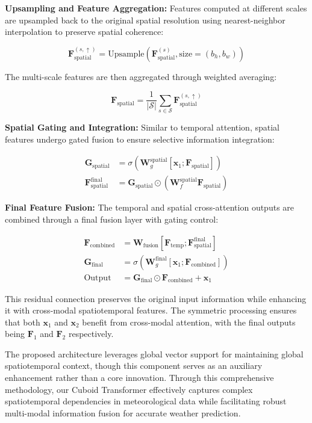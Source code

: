 \textbf{Upsampling and Feature Aggregation:} Features computed at different scales are upsampled back to the original spatial resolution using nearest-neighbor interpolation to preserve spatial coherence:

\begin{equation}
\mathbf{F}_{\text{spatial}}^{(s,\uparrow)} = \text{Upsample}\left(\mathbf{F}_{\text{spatial}}^{(s)}, \text{size}=(b_h, b_w)\right)
\end{equation}

The multi-scale features are then aggregated through weighted averaging:

\begin{equation}
\mathbf{F}_{\text{spatial}} = \frac{1}{|\mathcal{S}|} \sum_{s \in \mathcal{S}} \mathbf{F}_{\text{spatial}}^{(s,\uparrow)}
\end{equation}

\textbf{Spatial Gating and Integration:} Similar to temporal attention, spatial features undergo gated fusion to ensure selective information integration:

\begin{align}
\mathbf{G}_{\text{spatial}} &= \sigma\left(\mathbf{W}_g^{\text{spatial}} \left[\mathbf{x}_1; \mathbf{F}_{\text{spatial}}\right]\right) \\
\mathbf{F}_{\text{spatial}}^{\text{final}} &= \mathbf{G}_{\text{spatial}} \odot \left(\mathbf{W}_f^{\text{spatial}} \mathbf{F}_{\text{spatial}}\right)
\end{align}

\textbf{Final Feature Fusion:} The temporal and spatial cross-attention outputs are combined through a final fusion layer with gating control:

\begin{align}
\mathbf{F}_{\text{combined}} &= \mathbf{W}_{\text{fusion}} \left[\mathbf{F}_{\text{temp}}; \mathbf{F}_{\text{spatial}}^{\text{final}}\right] \\
\mathbf{G}_{\text{final}} &= \sigma\left(\mathbf{W}_g^{\text{final}} \left[\mathbf{x}_1; \mathbf{F}_{\text{combined}}\right]\right) \\
\text{Output} &= \mathbf{G}_{\text{final}} \odot \mathbf{F}_{\text{combined}} + \mathbf{x}_1
\end{align}

This residual connection preserves the original input information while enhancing it with cross-modal spatiotemporal features. The symmetric processing ensures that both $\mathbf{x}_1$ and $\mathbf{x}_2$ benefit from cross-modal attention, with the final outputs being $\mathbf{F}_1$ and $\mathbf{F}_2$ respectively.

The proposed architecture leverages global vector support for maintaining global spatiotemporal context, though this component serves as an auxiliary enhancement rather than a core innovation. Through this comprehensive methodology, our Cuboid Transformer effectively captures complex spatiotemporal dependencies in meteorological data while facilitating robust multi-modal information fusion for accurate weather prediction.
